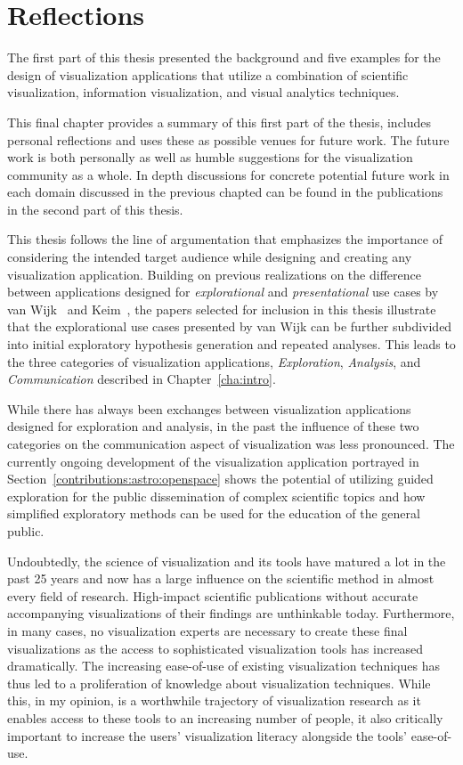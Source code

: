 \chapter{Reflections} \label{cha:reflections}
The first part of this thesis presented the background and five examples for the design of visualization applications that utilize a combination of scientific visualization, information visualization, and visual analytics techniques.

This final chapter provides a summary of this first part of the thesis, includes personal reflections and uses these as possible venues for future work.  The future work is both personally as well as humble suggestions for the visualization community as a whole.  In depth discussions for concrete potential future work in each domain discussed in the previous chapted can be found in the publications in the second part of this thesis.

This thesis follows the line of argumentation that emphasizes the importance of considering the intended target audience while designing and creating any visualization application.  Building on previous realizations on the difference between applications designed for \emph{explorational} and \emph{presentational} use cases by van Wijk~\cite{van2005value} and Keim~\cite{keim2006challenges}, the papers selected for inclusion in this thesis illustrate that the explorational use cases presented by van Wijk can be further subdivided into initial exploratory hypothesis generation and repeated analyses.  This leads to the three categories of visualization applications, \emph{Exploration}, \emph{Analysis}, and \emph{Communication} described in Chapter~\ref{cha:intro}.

While there has always been exchanges between visualization applications designed for exploration and analysis, in the past the influence of these two categories on the communication aspect of visualization was less pronounced.  The currently ongoing development of the visualization application portrayed in Section~\ref{contributions:astro:openspace} shows the potential of utilizing guided exploration for the public dissemination of complex scientific topics and how simplified exploratory methods can be used for the education of the general public.

Undoubtedly, the science of visualization and its tools have matured a lot in the past 25 years and now has a large influence on the scientific method in almost every field of research.  High-impact scientific publications without accurate accompanying visualizations of their findings are unthinkable today.  Furthermore, in many cases, no visualization experts are necessary to create these final visualizations as the access to sophisticated visualization tools has increased dramatically.  The increasing ease-of-use of existing visualization techniques has thus led to a proliferation of knowledge about visualization techniques.  While this, in my opinion, is a worthwhile trajectory of visualization research as it enables access to these tools to an increasing number of people, it also critically important to increase the users' visualization literacy alongside the tools' ease-of-use.

